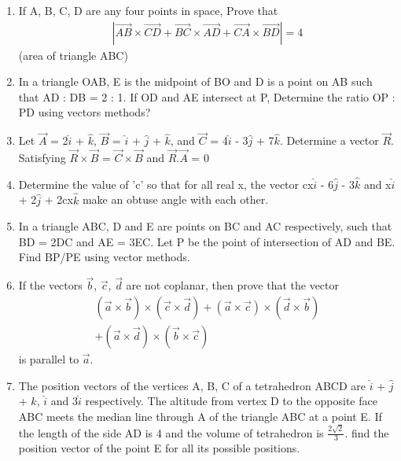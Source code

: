 \begin{enumerate}[label=\arabic*.,ref=\thesubsection.\theenumi]
\item If A, B, C, D are any four points in space, Prove that
\begin{align*}
|\overrightarrow{AB} \times \overrightarrow{CD} + \overrightarrow{BC} \times \overrightarrow{AD} + \overrightarrow{CA} \times \overrightarrow{BD}|=4
\end{align*}  
(area of triangle ABC)

\item In a triangle OAB, E is the midpoint of BO and D is a point on AB such that AD : DB = 2 : 1. If OD and AE intersect at P, Determine the ratio OP : PD using vectors methods?

\item Let $\overrightarrow{A}$ = 2$\hat{i}$ + $\hat{k}$, $\overrightarrow{B}$ = $\hat{i}$ + $\hat{j}$ + $\hat{k}$, and 
$\overrightarrow{C}$ = 4$\hat{i}$ - 3$\hat{j}$ + 7$\hat{k}$. Determine a vector $\overrightarrow{R}$. Satisfying 
$\overrightarrow{R} \times \overrightarrow{B}$ = $\overrightarrow{C} \times \overrightarrow{B}$ and $\overrightarrow{R}.\overrightarrow{A}$ = 0

\item Determine the value of 'c' so that for all real x, the vector cx$\hat{i}$ - 6$\hat{j}$ - 3$\hat{k}$ and 
x$\hat{i}$ + 2$\hat{j}$ + 2cx$\hat{k}$ make an obtuse angle with each other.

\item In a triangle ABC, D and E are points on BC and AC respectively, such that BD = 2DC and AE = 3EC. Let P be the point of intersection of AD and BE. Find BP/PE using vector methods.

\item If the vectors $\overrightarrow{b}$, $\overrightarrow{c}$, $\overrightarrow{d}$ are not coplanar, then prove that the vector
\begin{align*}
(\overrightarrow{a} \times \overrightarrow{b}) \times (\overrightarrow{c} \times \overrightarrow{d}) + (\overrightarrow{a} \times \overrightarrow{c}) \times (\overrightarrow{d} \times \overrightarrow{b})\\ + 
(\overrightarrow{a} \times \overrightarrow{d}) \times (\overrightarrow{b} \times \overrightarrow{c})
\end{align*}
is parallel to $\overrightarrow{a}$.

\item The position vectors of the vertices A, B, C of a tetrahedron ABCD are $\hat{i}$ + $\hat{j}$ + $\hat{k}$, $\hat{i}$ and 3$\hat{i}$ respectively. The altitude from vertex D to the opposite face ABC meets the median line through A of the triangle ABC at a point E. If the length of the side AD is 4 and the volume of tetrahedron is $\frac{2\sqrt{2}}{3}$. find the position vector of the point E for all its possible positions.


\end{enumerate}
